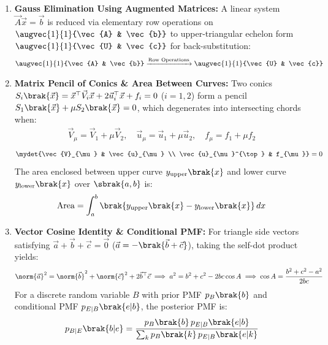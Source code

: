 \begin{enumerate}[label=\thesubsection.\arabic*, ref=\thesubsection.\theenumi]
	\item \textbf{Gauss Elimination Using Augmented Matrices:}
	A linear system $\vec{A}\vec{x} = \vec{b}$ is reduced via elementary row operations on $\augvec{1}{1}{\vec{A} & \vec{b}}$ to upper-triangular echelon form $\augvec{1}{1}{\vec{U} & \vec{c}}$ for back-substitution:
	\begin{align}
		\augvec{1}{1}{\vec{A} & \vec{b}} \xrightarrow{\text{Row Operations}} \augvec{1}{1}{\vec{U} & \vec{c}} \label{eq:gauss_elimination_def}
	\end{align}
	
	\item \textbf{Matrix Pencil of Conics \& Area Between Curves:}
	Two conics $S_i\brak{\vec{x}} = \vec{x}^{\top}\vec{V}_i\vec{x} + 2\vec{u}_i^{\top}\vec{x} + f_i = 0$ ($i = 1, 2$) form a pencil $S_1\brak{\vec{x}} + \mu S_2\brak{\vec{x}} = 0$, which degenerates into intersecting chords when:
	\begin{align}
		\vec{V}_{\mu} = \vec{V}_1 + \mu\vec{V}_2, \quad \vec{u}_{\mu} = \vec{u}_1 + \mu\vec{u}_2, \quad f_{\mu} = f_1 + \mu f_2 \label{eq:pencil_conics}
	\end{align}
	\begin{align}
		\mydet{\vec{V}_{\mu} & \vec{u}_{\mu} \\ \vec{u}_{\mu}^{\top} & f_{\mu}} = 0 \label{eq:degenerate_conic_det}
	\end{align}
	The area enclosed between upper curve $y_{\text{upper}}\brak{x}$ and lower curve $y_{\text{lower}}\brak{x}$ over $\sbrak{a, b}$ is:
	\begin{align}
		\text{Area} = \int_{a}^{b} \brak{y_{\text{upper}}\brak{x} - y_{\text{lower}}\brak{x}}\,dx \label{eq:area_between_curves}
	\end{align}
	
	\item \textbf{Vector Cosine Identity \& Conditional PMF:}
	For triangle side vectors satisfying $\vec{a} + \vec{b} + \vec{c} = \vec{0}$ ($\vec{a} = -\brak{\vec{b} + \vec{c}}$), taking the self-dot product yields:
	\begin{align}
		\norm{\vec{a}}^2 = \norm{\vec{b}}^2 + \norm{\vec{c}}^2 + 2\vec{b}^{\top}\vec{c} \implies a^2 = b^2 + c^2 - 2bc\cos A \implies \cos A = \frac{b^2 + c^2 - a^2}{2bc} \label{eq:vector_dot_cosine}
	\end{align}
	For a discrete random variable $B$ with prior PMF $p_B\brak{b}$ and conditional PMF $p_{E|B}\brak{e|b}$, the posterior PMF is:
	\begin{align}
		p_{B|E}\brak{b|e} = \frac{p_B\brak{b}\,p_{E|B}\brak{e|b}}{\sum_{k} p_B\brak{k}\,p_{E|B}\brak{e|k}} \label{eq:posterior_pmf_formula}
	\end{align}
	

\end{enumerate}
